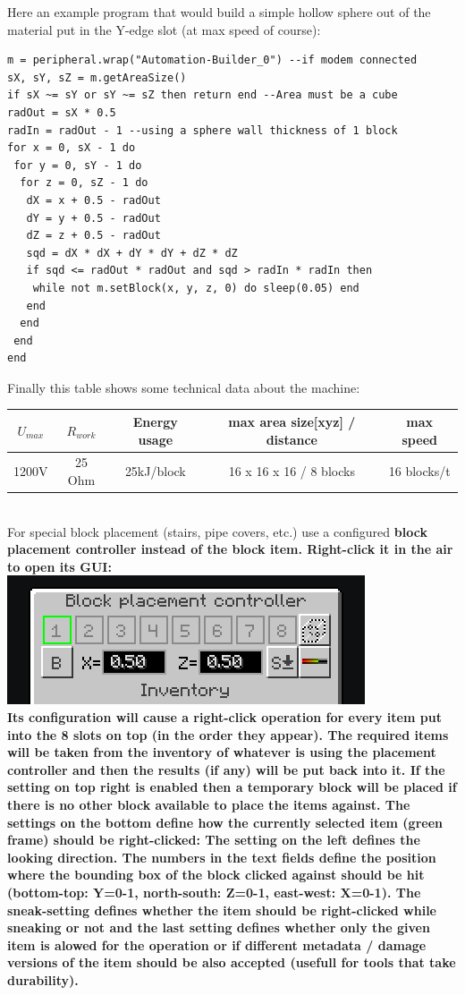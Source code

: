 \documentclass[11pt]{article} %
\begin{document}
Here an example program that would build a simple hollow sphere out of the material put in the Y-edge slot (at max speed of course):
\begin{lstlisting}
m = peripheral.wrap("Automation-Builder_0") --if modem connected
sX, sY, sZ = m.getAreaSize()
if sX ~= sY or sY ~= sZ then return end --Area must be a cube
radOut = sX * 0.5
radIn = radOut - 1 --using a sphere wall thickness of 1 block 
for x = 0, sX - 1 do
 for y = 0, sY - 1 do
  for z = 0, sZ - 1 do
   dX = x + 0.5 - radOut
   dY = y + 0.5 - radOut
   dZ = z + 0.5 - radOut
   sqd = dX * dX + dY * dY + dZ * dZ
   if sqd <= radOut * radOut and sqd > radIn * radIn then
    while not m.setBlock(x, y, z, 0) do sleep(0.05) end
   end
  end
 end
end
\end{lstlisting}
Finally this table shows some technical data about the machine: \\
\begin{tabular}{| c | c | c | c | c |} \hline
\bf $U_{max}$ & \bf $R_{work}$ & \bf Energy usage & \bf max area size[xyz] / distance & \bf max speed \\ \hline
1200V & 25 Ohm & 25kJ/block & 16 x 16 x 16 / 8 blocks & 16 blocks/t \\ \hline
\end{tabular} \\

For special block placement (stairs, pipe covers, etc.) use a configured \bf block placement controller \rm instead of the block item. Right-click it in the air to open its GUI: \\
\includegraphics[width = \textwidth]{placementController} \\
Its configuration will cause a right-click operation for every item put into the 8 slots on top (in the order they appear). The required items will be taken from the inventory of whatever is using the placement controller and then the results (if any) will be put back into it. If the setting on top right is enabled then a temporary block will be placed if there is no other block available to place the items against. The settings on the bottom define how the currently selected item (green frame) should be right-clicked: The setting on the left defines the looking direction. The numbers in the text fields define the position where the bounding box of the block clicked against should be hit (bottom-top: Y=0-1, north-south: Z=0-1, east-west: X=0-1). The sneak-setting defines whether the item should be right-clicked while sneaking or not and the last setting defines whether only the given item is alowed for the operation or if different metadata / damage versions of the item should be also accepted (usefull for tools that take durability).
\end{document}
